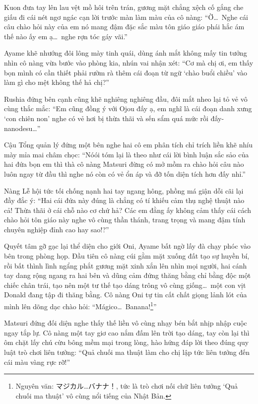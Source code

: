 \documentclass[../main.tex]{subfiles}
\begin{document}
Kuon đưa tay lên lau vệt mồ hôi trên trán, gương mặt chẳng xệch cố gắng che giấu đi cái nét ngơ ngác cạn lời trước màn làm màu của cô nàng: ``Ờ\dots\ Nghe cái câu chào hỏi này của em nó mang đậm đặc sắc màu tôn giáo giáo phái hắc ám thế nào ấy em ạ\dots\ nghe rợn tóc gáy vãi.''

Ayame khẽ nhướng đôi lông mày tinh quái, dùng ánh mắt không mấy tin tưởng nhìn cô nàng vừa bước vào phòng kia, nhún vai nhận xét: ``Cơ mà chị ơi, em thấy bọn mình có cần thiết phải rườm rà thêm cái đoạn từ ngữ `chào buổi chiều' vào làm gì cho mệt không thế hả chị?''

Rushia đứng bên cạnh cũng khẽ nghiêng nghiêng đầu, đôi mắt nheo lại tỏ vẻ vô cùng thắc mắc: ``Em cũng đồng ý với Ojou đấy ạ, em nghĩ là cái đoạn danh xưng `con chiên non' nghe có vẻ hơi bị thừa thãi và sến sẩm quá mức rồi đấy-nanodesu\dots''


Cậu Tổng quản lý đứng một bên nghe hai cô em phân tích chỉ trích liền khẽ nhíu mày mỉa mai châm chọc: ``Nóói tóm lại là theo như cái lời bình luận sắc sảo của hai đứa bọn em thì thà cô nàng Matsuri đừng có mở mồm ra chào hỏi câu nào luôn ngay từ đầu thì nghe nó còn có vẻ ổn áp và đỡ tốn diện tích hơn đấy nhỉ.''

Nàng Lễ hội tức tối chống nạnh hai tay ngang hông, phồng má giận dỗi cãi lại đầy đắc ý: ``Hai cái đứa này đúng là chẳng có tí khiếu cảm thụ nghệ thuật nào cả! Thừa thãi ở cái chỗ nào cơ chứ hả? Các em đằng ấy không cảm thấy cái cách chào hỏi tôn giáo này nghe vô cùng thần thánh, trang trọng và mang đậm tính chuyên nghiệp đỉnh cao hay sao!?''

\ct

Quyết tâm gỡ gạc lại thể diện cho giới Oni, Ayame bất ngờ lấy đà chạy phóc vào bên trong phòng họp. Đầu tiên cô nàng cúi gằm mặt xuống đất tạo sự huyền bí, rồi bất thình lình ngẩng phắt gương mặt xinh xắn lên nhìn mọi người, hai cánh tay dang rộng ngang ra hai bên và dũng cảm đứng thăng bằng chỉ bằng độc một chiếc chân trái, tạo nên một tư thế tạo dáng trông vô cùng giống\dots\ một con vịt Donald đang tập đi thăng bằng. Cô nàng Oni tự tin cất chất giọng lảnh lót của mình lên dõng dạc chào hỏi: ``Mágico\dots\ Banana!\footnote{Nguyên văn: マジカル…バナナ！, tức là trò chơi nối chữ liên tưởng `Quả chuối ma thuật' vô cùng nổi tiếng của Nhật Bản.}''

Matsuri đứng đối diện nghe thấy thế liền vô cùng nhạy bén bắt nhịp nhập cuộc ngay tắp lự. Cô nàng một tay giơ cao nắm đấm lên trời tạo dáng, tay còn lại thì ôm chặt lấy chú cừu bông mềm mại trong lòng, hào hứng đáp lời theo đúng quy luật trò chơi liên tưởng: ``Quả chuối ma thuật làm cho chị lập tức liên tưởng đến cái màu vàng rực rỡ!''
\end{document}
